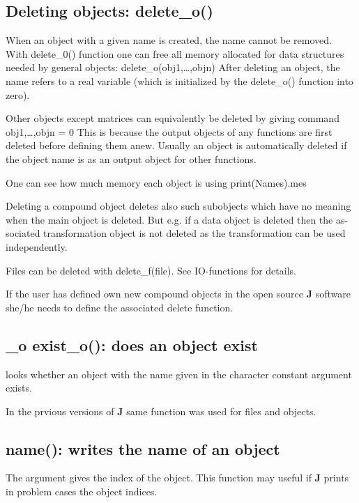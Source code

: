 \subsection{Deleting objects: delete\_o()}
\label{delete}
When an object with a given name is created, the name cannot be removed. With
delete\_0() function one can free all memory allocated for data structures needed
by general objects:
delete\_o(obj1,…,objn)
After deleting an object, the name refers to a real variable (which is
initialized by the delete\_o() function into zero).
\begin{note}
Other objects except matrices can equivalently be deleted by giving
command
obj1,…,objn = 0
This is because the output objects of any functions are first deleted before
defining them anew. Usually an object is automatically deleted if the object
name is as an output object for other functions.
\end{note}
\begin{note}
One can see how much memory each object is using \textcolor{VioletRed}{print}(Names).mes
\end{note}
\begin{note}
Deleting a compound object deletes also such
subobjects which have no meaning when the main object is deleted. But e.g. if a
data object is deleted then the as-sociated transformation object is not
deleted as the transformation can be used independently.
\end{note}
\begin{note}
Files can be deleted with delete\_f(file). See IO-functions for
details.
\end{note}
\begin{note}
If the user has defined own new compound objects in the open source
\textbf{J} software she/he needs to define the associated delete function.
\end{note}
\subsection{_o exist\_o(): does an object exist}
\label{exist}
looks whether an object with the name given in
the character constant  argument exists.
\begin{note}
In the prvious versions of \textbf{J} same function was used for files and objects.
\end{note}
\subsection{\textcolor{VioletRed}{name}(): writes the name of an object}
\label{name}
The argument gives the index of the object. This function
may useful if \textbf{J} prints in problem cases the object indices.
